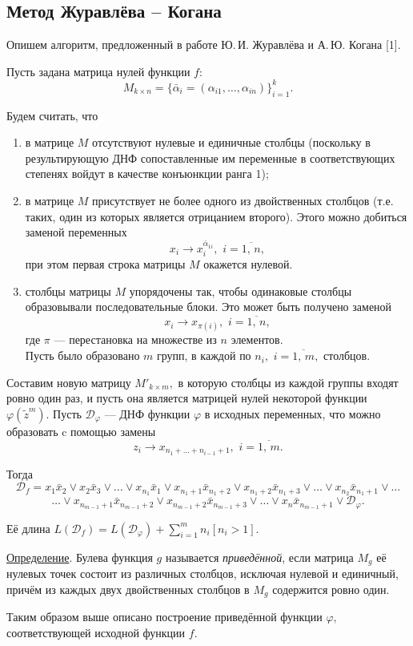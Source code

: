 \documentclass[12pt,a4paper,oneside,fleqn,leqno]{article}
\theoremstyle{definition}
\begin{document}
		\subsection{Метод Журавлёва -- Когана} \label{zhuravlev_kogan}
			Опишем алгоритм, предложенный в работе Ю.\,И. Журавлёва и А.\,Ю. Когана [1].\par
			Пусть задана матрица нулей функции $f:$
			$$
				M_{k \times n} = \{\bar{\alpha}_i = (\alpha_{i1},\ldots,\alpha_{in}) \}_{i = 1}^k.
			$$\par
			Будем считать, что
			\begin{enumerate}
				\item
				в матрице $M$ отсутствуют нулевые и единичные столбцы (поскольку в результирующую ДНФ сопоставленные им переменные в соответствующих степенях войдут в качестве конъюнкции ранга 1);
				\item
				в матрице $M$ присутствует не более одного из двойственных столбцов (т.е. таких, один из которых является отрицанием второго). Этого можно добиться заменой переменных
				$$
					x_i \rightarrow x_i^{\bar{\alpha}_{1i}},\,\,i = \overline{1,\,n},
				$$
				при этом первая строка матрицы $M$ окажется нулевой.
				\item
				столбцы матрицы $M$ упорядочены так, чтобы одинаковые столбцы образовывали последовательные блоки. Это может быть получено заменой
					$$
					x_i \rightarrow x_{\pi(i)},\,\,i = \overline{1,\,n},
				$$
				где $\pi$ --- перестановка на множестве из $n$ элементов.\\
				Пусть было образовано $m$ групп, в каждой по $n_i,\,\,i = \overline{1,\,m},$ столбцов.
			\end{enumerate}\par
			Составим новую матрицу $M'_{k \times m},$ в которую столбцы из каждой группы входят ровно один раз, и пусть она является матрицей нулей некоторой функции $\varphi(\tilde z^m).$ Пусть $\mathcal{D}_{\varphi}$ --- ДНФ функции $\varphi$ в исходных переменных, что можно образовать c помощью замены
			$$
				z_i \rightarrow x_{n_1 + \ldots + n_{i - 1} + 1},\,\,i = \overline{1,\,m}.
			$$\par
			Тогда
			$$
				\mathcal{D}_f = x_1\bar{x}_2 \vee x_2\bar{x}_3 \vee \ldots \vee x_{n_1}\bar{x}_1 \vee x_{n_1 + 1}\bar{x}_{n_1 + 2} \vee x_{n_1 + 2}\bar{x}_{n_1 + 3} \vee \ldots \vee x_{n_2}\bar{x}_{n_1 + 1} \vee \ldots
			$$
			$$
				\ldots \vee x_{n_{m - 1} + 1}\bar{x}_{n_{m - 1} + 2} \vee x_{n_{m - 1} + 2}\bar{x}_{n_{m - 1} + 3} \vee \ldots \vee x_{n}\bar{x}_{n_{m - 1} + 1} \vee \mathcal{D}_{\varphi}.
			$$\par
			Её длина $L(\mathcal{D}_f) = L(\mathcal{D}_{\varphi}) + \sum\limits_{i = 1}^m n_i[n_i > 1].$\par
			\underline{Определение}. Булева функция $g$ называется {\it приведённой}, если матрица $M_g$ её нулевых точек состоит из различных столбцов, исключая нулевой и единичный, причём из каждых двух двойственных столбцов в $M_g$ содержится ровно один.\par
			Таким образом выше описано построение приведённой функции $\varphi,$ соответствующей исходной функции $f.$
\end{document}
